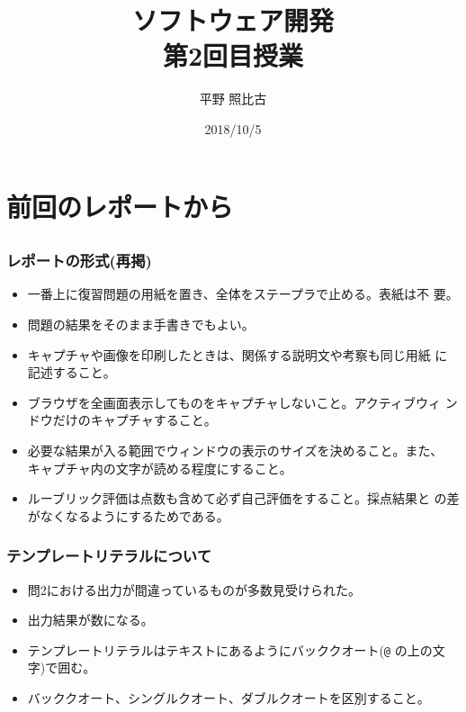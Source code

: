 
\title{ソフトウェア開発\\第2回目授業}
\author{平野 照比古}
\institute{}
\date{2018/10/5}

\frame{\maketitle}
\section{前回のレポートから}\subsection{}
\begin{frame}[containsverbatim]
 \frametitle{レポートの形式(再掲)}
 \begin{itemize}
  \item 一番上に復習問題の用紙を置き、全体をステープラで止める。表紙は不
        要。
  \item 問題の結果をそのまま手書きでもよい。
  \item キャプチャや画像を印刷したときは、関係する説明文や考察も同じ用紙
        に記述すること。
  \item ブラウザを全画面表示してものをキャプチャしないこと。アクティブウィ
        ンドウだけのキャプチャすること。
  \item 必要な結果が入る範囲でウィンドウの表示のサイズを決めること。また、
        キャプチャ内の文字が読める程度にすること。
  \item ルーブリック評価は点数も含めて必ず自己評価をすること。採点結果と
        の差がなくなるようにするためである。
 \end{itemize}
\end{frame}
\begin{frame}[containsverbatim]
 \frametitle{テンプレートリテラルについて}
\begin{itemize}
 \item 問2における出力が間違っているものが多数見受けられた。
 \item 出力結果が数になる。
 \item テンプレートリテラルはテキストにあるようにバッククオート(\Verb+@+
       の上の文字)で囲む。
 \item バッククオート、シングルクオート、ダブルクオートを区別すること。
\end{itemize} 
\end{frame}
